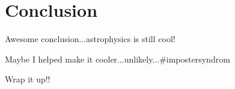 \chapter{Conclusion}


Awesome conclusion...astrophysics is still cool!

Maybe I helped make it cooler...unlikely...$\#$impostersyndrom

Wrap it up!!
